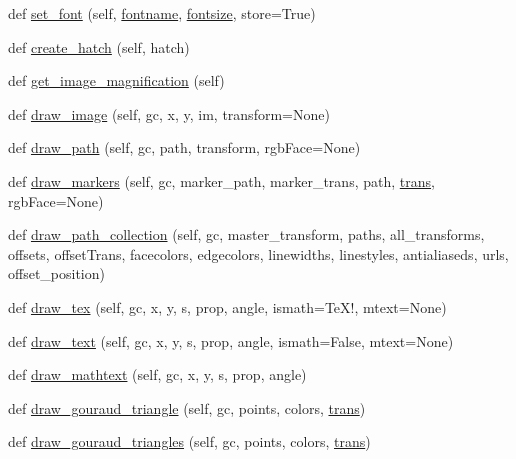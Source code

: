 \begin{DoxyCompactItemize}
def \hyperlink{classmatplotlib_1_1backends_1_1backend__ps_1_1RendererPS_ac39bc50f2deea44547c423ef743e81af}{set\+\_\+font} (self, \hyperlink{classmatplotlib_1_1backends_1_1backend__ps_1_1RendererPS_acaa9986fe93740d50865b1ec99a0f502}{fontname}, \hyperlink{classmatplotlib_1_1backends_1_1backend__ps_1_1RendererPS_a3a73de7fa5c86f8bfa3971b3ffc9b5ae}{fontsize}, store=True)
\item 
def \hyperlink{classmatplotlib_1_1backends_1_1backend__ps_1_1RendererPS_ae20beb33fb398a68be8bb478773d8b6d}{create\+\_\+hatch} (self, hatch)
\item 
def \hyperlink{classmatplotlib_1_1backends_1_1backend__ps_1_1RendererPS_a4fff1de64d956b07e5c7b02540791d5b}{get\+\_\+image\+\_\+magnification} (self)
\item 
def \hyperlink{classmatplotlib_1_1backends_1_1backend__ps_1_1RendererPS_a3e84c064f41320d820aac6eaf1ccc309}{draw\+\_\+image} (self, gc, x, y, im, transform=None)
\item 
def \hyperlink{classmatplotlib_1_1backends_1_1backend__ps_1_1RendererPS_a6468e9fa9da13d0da64f8a42c7198550}{draw\+\_\+path} (self, gc, path, transform, rgb\+Face=None)
\item 
def \hyperlink{classmatplotlib_1_1backends_1_1backend__ps_1_1RendererPS_a228293c76c26d654e3ef2e8bb62987cc}{draw\+\_\+markers} (self, gc, marker\+\_\+path, marker\+\_\+trans, path, \hyperlink{size_2foo_8f90_afabfd8da71309850231a00e53c61f106}{trans}, rgb\+Face=None)
\item 
def \hyperlink{classmatplotlib_1_1backends_1_1backend__ps_1_1RendererPS_ad7c4df9e5eecc9cbd82d5d505082e776}{draw\+\_\+path\+\_\+collection} (self, gc, master\+\_\+transform, paths, all\+\_\+transforms, offsets, offset\+Trans, facecolors, edgecolors, linewidths, linestyles, antialiaseds, urls, offset\+\_\+position)
\item 
def \hyperlink{classmatplotlib_1_1backends_1_1backend__ps_1_1RendererPS_a32f6e7811b42a19e82f67b004362dcdc}{draw\+\_\+tex} (self, gc, x, y, s, prop, angle, ismath=\textquotesingle{}Te\+X!\textquotesingle{}, mtext=None)
\item 
def \hyperlink{classmatplotlib_1_1backends_1_1backend__ps_1_1RendererPS_a22a444853d4753c7976e42a772f05a21}{draw\+\_\+text} (self, gc, x, y, s, prop, angle, ismath=False, mtext=None)
\item 
def \hyperlink{classmatplotlib_1_1backends_1_1backend__ps_1_1RendererPS_a95fa57c4494c128eaeccb8ecdcb29387}{draw\+\_\+mathtext} (self, gc, x, y, s, prop, angle)
\item 
def \hyperlink{classmatplotlib_1_1backends_1_1backend__ps_1_1RendererPS_afd49e4480b5320c4a5fd22ed3566dc15}{draw\+\_\+gouraud\+\_\+triangle} (self, gc, points, colors, \hyperlink{size_2foo_8f90_afabfd8da71309850231a00e53c61f106}{trans})
\item 
def \hyperlink{classmatplotlib_1_1backends_1_1backend__ps_1_1RendererPS_ad18b9315bd360a7caf3a47758b2a9298}{draw\+\_\+gouraud\+\_\+triangles} (self, gc, points, colors, \hyperlink{size_2foo_8f90_afabfd8da71309850231a00e53c61f106}{trans})
\end{DoxyCompactItemize}

